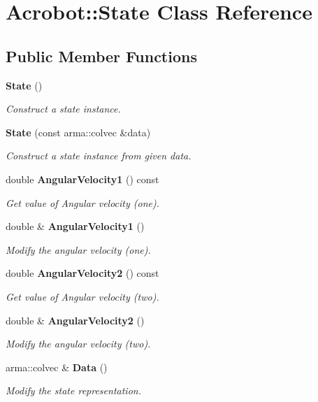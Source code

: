 \section{Acrobot\+:\+:State Class Reference}
\label{classmlpack_1_1rl_1_1Acrobot_1_1State}
\subsection*{Public Member Functions}
\begin{DoxyCompactItemize}
\item 
\textbf{ State} ()
\begin{DoxyCompactList}\small\item\em Construct a state instance. \end{DoxyCompactList}\item 
\textbf{ State} (const arma\+::colvec \&data)
\begin{DoxyCompactList}\small\item\em Construct a state instance from given data. \end{DoxyCompactList}\item 
double \textbf{ Angular\+Velocity1} () const
\begin{DoxyCompactList}\small\item\em Get value of Angular velocity (one). \end{DoxyCompactList}\item 
double \& \textbf{ Angular\+Velocity1} ()
\begin{DoxyCompactList}\small\item\em Modify the angular velocity (one). \end{DoxyCompactList}\item 
double \textbf{ Angular\+Velocity2} () const
\begin{DoxyCompactList}\small\item\em Get value of Angular velocity (two). \end{DoxyCompactList}\item 
double \& \textbf{ Angular\+Velocity2} ()
\begin{DoxyCompactList}\small\item\em Modify the angular velocity (two). \end{DoxyCompactList}\item 
arma\+::colvec \& \textbf{ Data} ()
\begin{DoxyCompactList}\small\item\em Modify the state representation. \end{DoxyCompactList}\item 

\end{DoxyCompactItemize}
